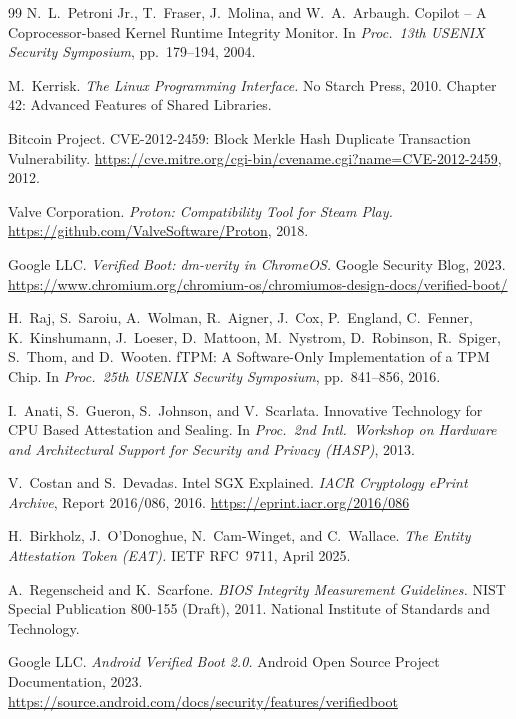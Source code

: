\documentclass[11pt]{article}
\begin{document}
\begin{thebibliography}{99}
N.\ L.\ Petroni Jr., T.\ Fraser, J.\ Molina, and W.\ A.\ Arbaugh. Copilot -- A Coprocessor-based Kernel Runtime Integrity Monitor. In \textit{Proc.\ 13th USENIX Security Symposium}, pp.\ 179--194, 2004.

M.\ Kerrisk. \textit{The Linux Programming Interface.} No Starch Press, 2010. Chapter 42: Advanced Features of Shared Libraries.

Bitcoin Project. CVE-2012-2459: Block Merkle Hash Duplicate Transaction Vulnerability. \url{https://cve.mitre.org/cgi-bin/cvename.cgi?name=CVE-2012-2459}, 2012.

Valve Corporation. \textit{Proton: Compatibility Tool for Steam Play.} \url{https://github.com/ValveSoftware/Proton}, 2018.

Google LLC. \textit{Verified Boot: dm-verity in ChromeOS.} Google Security Blog, 2023. \url{https://www.chromium.org/chromium-os/chromiumos-design-docs/verified-boot/}

H.\ Raj, S.\ Saroiu, A.\ Wolman, R.\ Aigner, J.\ Cox, P.\ England, C.\ Fenner, K.\ Kinshumann, J.\ Loeser, D.\ Mattoon, M.\ Nystrom, D.\ Robinson, R.\ Spiger, S.\ Thom, and D.\ Wooten. fTPM: A Software-Only Implementation of a TPM Chip. In \textit{Proc.\ 25th USENIX Security Symposium}, pp.\ 841--856, 2016.

I.\ Anati, S.\ Gueron, S.\ Johnson, and V.\ Scarlata. Innovative Technology for CPU Based Attestation and Sealing. In \textit{Proc.\ 2nd Intl.\ Workshop on Hardware and Architectural Support for Security and Privacy (HASP)}, 2013.

V.\ Costan and S.\ Devadas. Intel SGX Explained. \textit{IACR Cryptology ePrint Archive}, Report 2016/086, 2016. \url{https://eprint.iacr.org/2016/086}

H.\ Birkholz, J.\ O'Donoghue, N.\ Cam-Winget, and C.\ Wallace. \textit{The Entity Attestation Token (EAT).} IETF RFC~9711, April 2025.

A.\ Regenscheid and K.\ Scarfone. \textit{BIOS Integrity Measurement Guidelines.} NIST Special Publication 800-155 (Draft), 2011. National Institute of Standards and Technology.

Google LLC. \textit{Android Verified Boot 2.0.} Android Open Source Project Documentation, 2023. \url{https://source.android.com/docs/security/features/verifiedboot}

\end{thebibliography}
\end{document}

